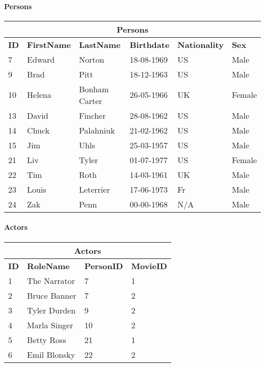 \paragraph{Persons}
\begin{center}
\begin{tabular}{|l|l|l|l|l|l|}
\hline
\multicolumn{6}{|c|}{Persons} \\ \hline \hline
\textbf{ID} & \textbf{FirstName} & \textbf{LastName} & \textbf{Birthdate} & \textbf{Nationality} & \textbf{Sex} \\ \hline \hline
7 & Edward & Norton & 18-08-1969 & US & Male \\ \hline
9 & Brad & Pitt & 18-12-1963 & US & Male \\ \hline
10 & Helena & Bonham Carter & 26-05-1966 & UK & Female \\ \hline
13 & David & Fincher & 28-08-1962 & US & Male \\ \hline
14 & Chuck & Palahniuk & 21-02-1962 & US & Male \\ \hline
15 & Jim & Uhls & 25-03-1957 & US & Male \\ \hline
21 & Liv & Tyler & 01-07-1977 & US & Female \\ \hline
22 & Tim & Roth & 14-03-1961 & UK & Male \\ \hline
23 & Louis & Leterrier & 17-06-1973 & Fr & Male \\ \hline
24 & Zak & Penn & 00-00-1968 & N/A & Male \\ \hline
\end{tabular}
\end{center}

\paragraph{Actors}
\begin{center}
\begin{tabular}{|l|l|l|l|}
\hline
\multicolumn{4}{|c|}{Actors} \\ \hline \hline
\textbf{ID} & \textbf{RoleName} & \textbf{PersonID} & \textbf{MovieID} \\ \hline \hline
1 & The Narrator & 7 & 1 \\ \hline
2 & Bruce Banner & 7 & 2 \\ \hline
3 & Tyler Durden & 9 & 2 \\ \hline
4 & Marla Singer & 10 & 2 \\ \hline
5 & Betty Ross & 21 & 1 \\ \hline
6 & Emil Blonsky & 22 & 2 \\\hline 
\end{tabular}
\end{center}

